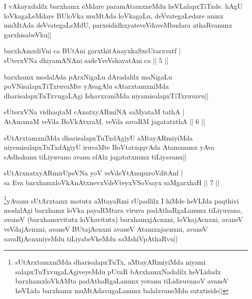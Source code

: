 \begin{artha}
I vAkayxdalilx barxhamx eMdare paramAtamxneMdu heVLalapxTiTxde. hAgU loVkagaLeMdare BUloVka muMtAda loVkagaLu, deVvategaLedare aninx muMtAda deVvategaLeMdU, parxsididhxyateveVdaveMbudara athaRvanunx garxhisabeVku||
\end{artha}%


\begin{shl}
barxhAmxdiVni ca BUtAni garxthitAnayxkaSxsUtarxvatf |\\
sUterxVNa dhiyamANAni sadeYveVshayatAni ca \hfill || 5 ||
\end{shl}

\begin{artha}
barxhamx modalAda pArxNigaLu dAradalilx maNigaLu poVNisalapxTiTxruvaMte yAvagAlu sAtarxtamxniMda dharisalapxTuTxvugaLAgi IshavxraniMda niyamisalapxTiTxruvavu||
\end{artha}


\begin{shl}
sUterxVNa vidhaqtaM cAnatxyARmiNA saMyataM tathA |\\
AtAmxnaM veVda BoVkAtxraM, veVda savaRM jagatatxthA \hfill || 6 ||
\end{shl}

\begin{artha}
sUtArxtamxniMda dharisalapxTuTxdAgiyU aMtayARmiyiMda niyemisalapxTuTxdAgiyU iruvaMte BoVtatxqqvAda Atamxnunx yAva sAdhakanu tiLiyuvano avanu elAlx jagatatxnunx tiLiyavanu||
\end{artha}

\begin{shl}
sUtArxnatxyARmirUpeVNa yoV veVdeYtAnupxroVditAnf |\\
sa Eva barxhamxloVkAnAtxnevxVdeVteyxVSoV\s sayx saMgarxhaH \hfill || 7 ||
\end{shl}

\begin{artha}
\footnote[1]{sUtArxtamxniMda dharisalapxTuTx, aMtayARmiyiMda niyami salapxTuTxvugaLAgiveyeMdu pUvaR bArxhamxNadalilx heVLidadx barxhamxloVkAMta padAthaRgaLanunx yovanu tiLidiruvanoV avaneV heVLida barxhamx muMtAdavugaLanunx balalxvaneMdu sutxtiside||}yAvanu sUtArxtamx matutx aMtayaRmi rUpadlilx I hiMde heVLIda paqthivi modalAgi barxhamx loVka payaRMtara viruva padAthaRgaLanunx tiLiyuvano, avaneV (barxhamxvitutx loVkavitutx) barxhamxjAcnxni, loVkajAcnxni, avaneV veVdajAcnxni, avaneV BUtajAcnxni avaneV Atamxnjacnxni, avaneV savaRjAcnxniyeMdu tiLiyabeVkeMdu saMshiVpAthaRvu||
\end{artha}

